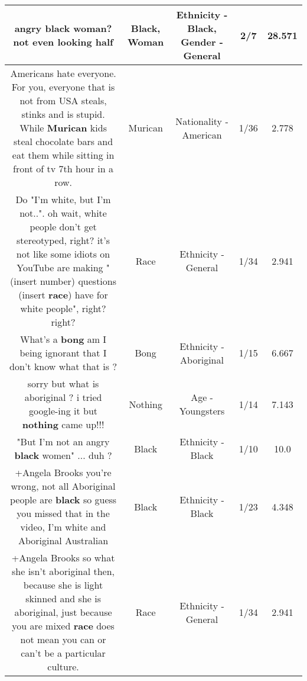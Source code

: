 \documentclass[11pt]{article}
\newlength\mylength
\begin{document}
\begin{center}
\begin{longtable}{|C{.65\mylength}|C{.30\mylength}|C{.12\mylength}|C{.12\mylength}|C{.12\mylength}|}
  \small angry \textbf{black} \textbf{woman}? not even looking half\normalsize   & Black, Woman & Ethnicity - Black, Gender - General & 2/7 & 28.571 \\  \hline
  \small Americans hate everyone. For you, everyone that is not from USA steals, stinks and is stupid. While \textbf{Murican} kids steal chocolate bars and eat them while sitting in front of tv 7th hour in a row.\normalsize   & Murican & Nationality - American & 1/36 & 2.778 \\  \hline
  \small Do "I'm white, but I'm not..". oh wait, white people don't get stereotyped, right? it's not like some idiots on YouTube are making "(insert number) questions  (insert \textbf{race}) have for white people", right? right?\normalsize   & Race & Ethnicity - General & 1/34 & 2.941 \\  \hline
  \small What's a \textbf{bong} am I being ignorant that I don't know what that is ?\normalsize   & Bong & Ethnicity - Aboriginal & 1/15 & 6.667 \\  \hline
  \small sorry but what is aboriginal ? i tried google-ing it but \textbf{nothing} came up!!!\normalsize   & Nothing & Age - Youngsters & 1/14 & 7.143 \\  \hline
  \small "But I'm not an angry \textbf{black} women" ... duh ?\normalsize   & Black & Ethnicity - Black & 1/10 & 10.0 \\  \hline
  \small +Angela Brooks you're wrong, not all Aboriginal people are \textbf{black} so guess you missed that in the video, I'm white and Aboriginal Australian\normalsize   & Black & Ethnicity - Black & 1/23 & 4.348 \\  \hline
  \small +Angela Brooks so what she isn't aboriginal then, because she is light skinned and she is aboriginal, just because you are mixed \textbf{race} does not mean you can or can't be a particular culture.\normalsize   & Race & Ethnicity - General & 1/34 & 2.941 \\  \hline

\end{longtable}
\end{center}
\end{document}
